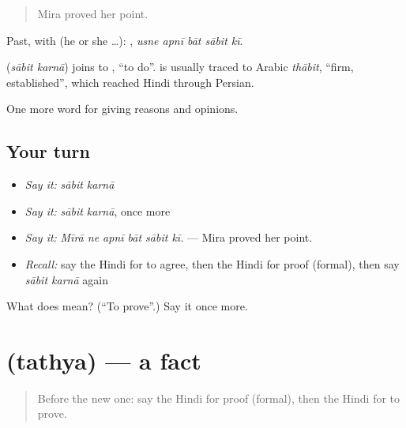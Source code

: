 \begin{quote}
Mira proved her point.
\end{quote}

Past, with  (he or she …):     , \emph{usne apnī bāt sābit kī}.

\begin{cousinweb}
\textbf{ } (\emph{sābit karnā}) joins  to , \textquotedblleft{}to do\textquotedblright{}.  is usually traced to Arabic \emph{thābit}, \textquotedblleft{}firm, established\textquotedblright{}, which reached Hindi through Persian.
\end{cousinweb}

\begin{grammarlens}[title={What you've built}]
One more word for giving reasons and opinions.
\end{grammarlens}

\subsection*{Your turn}
\begin{itemize}
\raggedright
  \item \emph{Say it:} \emph{sābit karnā}
  \item \emph{Say it:} \emph{sābit karnā}, once more
  \item \emph{Say it:} \emph{Mīrā ne apnī bāt sābit kī.} — Mira proved her point.
  \item \emph{Recall:} say the Hindi for to agree, then the Hindi for proof (formal), then say \emph{sābit karnā} again
\end{itemize}

\begin{tcolorbox}[breakable,colback=teal!4,colframe=teal!35!black,title={Before you move on}]
What does   mean? (\textquotedblleft{}To prove\textquotedblright{}.) Say it once more.
\end{tcolorbox}
\section[\texorpdfstring{\hi{तथ्य} (tathya)}{तथ्य (tathya)}]{ (tathya) — a fact}

\label{lesson:HI-C348-tathya}



\begin{quote}
Before the new one: say the Hindi for proof (formal), then the Hindi for to prove.
\end{quote}

